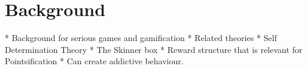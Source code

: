 \section{Background}
* Background for serious games and gamification
* Related theories
    * Self Determination Theory
    * The Skinner box
        * Reward structure that is relevant for Pointsification
        * Can create addictive behaviour. 